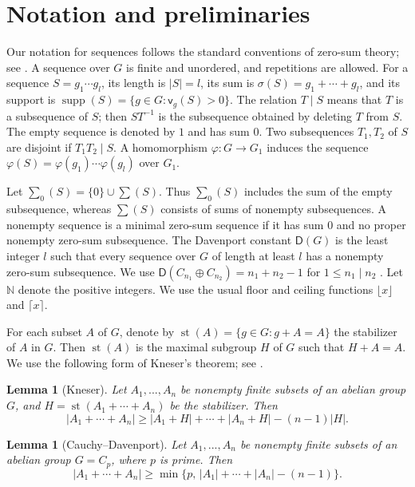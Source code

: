 \documentclass[10pt,a4paper]{amsart}
\newtheorem{lem}[thm]{Lemma}
\theoremstyle{definition}
\theoremstyle{remark}
\numberwithin{equation}{section}
\newcommand{\N}{\mathbb N}
\DeclareMathOperator{\supp}{supp}
\DeclareMathOperator{\st}{st}
\begin{document}
\section{Notation and preliminaries}

Our notation for sequences follows the standard conventions of zero-sum
theory; see \cite{[GG2006],[GH2006]}.
A sequence over $G$ is finite and unordered, and repetitions are allowed.
For a sequence $S=g_1\cdots g_l$, its length is $|S|=l$, its sum is
$\sigma(S)=g_1+\cdots+g_l$, and its support is
$\supp(S)=\{g\in G:\mathsf v_g(S)>0\}$.
The relation $T\mid S$ means that $T$ is a subsequence of $S$;
then $ST^{-1}$ is the subsequence obtained by deleting $T$ from $S$.
The empty sequence is denoted by $1$ and has sum $0$.
Two subsequences $T_1,T_2$ of $S$ are disjoint if $T_1T_2\mid S$.
A homomorphism $\varphi:G\to G_1$ induces the sequence
$\varphi(S)=\varphi(g_1)\cdots\varphi(g_l)$ over $G_1$.

Let $\sum_0(S)=\{0\}\cup\sum(S)$.
Thus $\sum_0(S)$ includes the sum of the empty subsequence, whereas
$\sum(S)$ consists of sums of nonempty subsequences.
A nonempty sequence is a minimal zero-sum sequence if it has sum $0$
and no proper nonempty zero-sum subsequence.
The Davenport constant $\mathsf D(G)$ is the least integer $l$ such that
every sequence over $G$ of length at least $l$ has a nonempty zero-sum
subsequence. We use
$\mathsf D(C_{n_1}\oplus C_{n_2})=n_1+n_2-1$ for $1\le n_1\mid n_2$
\cite[Theorem~5.8.3]{[GH2006]}.
Let $\N$ denote the positive integers. We use the usual floor and
ceiling functions $\lfloor x\rfloor$ and $\lceil x\rceil$.

For each subset $A$ of $G$, denote by $\st(A) = \{g \in G : g + A = A\}$ the stabilizer of $A$ in $G$. Then $\st(A)$ is the maximal subgroup $H$ of $G$ such that $H + A = A$. We use the following form of Kneser's theorem; see \cite[Theorem~4.4]{[N1996]}.

\begin{lem}[Kneser]\label{lem2.1}
	Let $A_1,...,A_n$ be nonempty finite subsets of an
	abelian group $G$, and $H= \st(A_1+\cdots +A_n)$ be the stabilizer. Then
	$$|A_1+\cdots +A_n| \ge  |A_1+H|+\cdots +|A_n+H| -(n-1)|H|.$$
	
\end{lem}

\begin{lem}[Cauchy--Davenport]\label{lem2.2}
	Let $A_1,...,A_n$ be nonempty finite subsets of an
	abelian group $G=C_p$, where $p$ is prime. Then
	$$|A_1+\cdots +A_n|\ge\min\{p,\,|A_1|+\cdots +|A_n|-(n-1)\}.$$
	
\end{lem}
\end{document}
